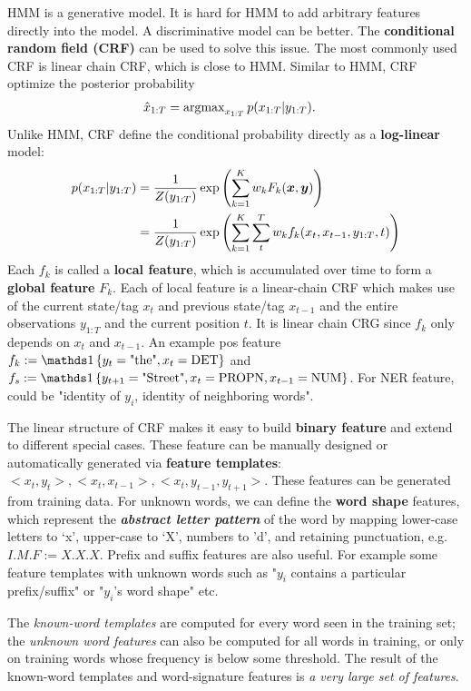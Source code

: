 \documentclass[11pt]{article}
\begin{document}
HMM is a generative model. It is hard for HMM to add arbitrary features directly into the model. A discriminative model can be better. The \textbf{conditional random field (CRF)} \citep{sutton2012introduction} can be used to solve this issue. The most commonly used CRF is linear chain CRF, which is close to HMM. Similar to HMM, CRF optimize the posterior probability
\begin{align*}
\hat{x}_{1:T} &= \operatorname{argmax}_{x_{1:T}} p(x_{1:T} | y_{1:T}).
\end{align*} Unlike HMM, CRF define the conditional probability directly as a \textbf{log-linear} model: 
\begin{align*}
p(x_{1:T} | y_{1:T}) &= \frac{1}{Z(y_{1:T})} \exp\left(\sum_{k=1}^{K}w_{k}F_{k}(\boldsymbol{x}, \boldsymbol{y})\right)\\
&= \frac{1}{Z(y_{1:T})} \exp\left(\sum_{k=1}^{K}\sum_{t}^{T}w_{k}f_{k}(x_{t}, x_{t-1}, y_{1:T}, t)\right)\\
\end{align*} Each $f_{k}$ is called a \textbf{local feature}, which is accumulated over time to form a \textbf{global feature} $F_{k}$. Each of local feature is a linear-chain CRF which makes use of the current state/tag $x_{t}$ and previous state/tag $x_{t-1}$ and the entire observations $y_{1:T}$ and the current position $t$. It is linear chain CRG since $f_{k}$ only depends on $x_{t}$ and $x_{t-1}$. An example pos feature $f_{k}:= \ind{y_{t} = \text{"the"}, x_{t} = \text{DET}}$ and 
$f_{s} := \ind{y_{t+1} = \text{"Street"}, x_{t}=\text{PROPN},  x_{t-1}=\text{NUM}}$. For NER feature, could be "identity of $y_{i}$, identity of neighboring words". 

The linear structure of CRF makes it easy to build \textbf{binary feature} and extend to different special cases. These feature can be manually designed or automatically generated via \textbf{feature templates}: $<x_{t}, y_{t}>, <x_{t}, x_{t-1}>, <x_{t}, y_{t-1}, y_{t+1}>$. These features can be generated from training data. For unknown words, we can define the \textbf{word shape} features, which represent the \emph{\textbf{abstract letter pattern}} of the word by mapping lower-case letters to ‘x’, upper-case to ‘X’, numbers to ’d’, and retaining punctuation, e.g. $I.M.F:= X.X.X$. Prefix and suffix features are also useful. For example some feature templates with unknown words such as "$y_i$ contains a particular prefix/suffix" or "$y_{i}$'s word shape" etc.

The \emph{known-word templates} are computed for every word seen in the training set; the \emph{unknown word features} can also be computed for all words in training, or only on training words whose frequency is below some threshold. The result of the known-word templates and word-signature features is \emph{a very large set of features}.
\end{document}
